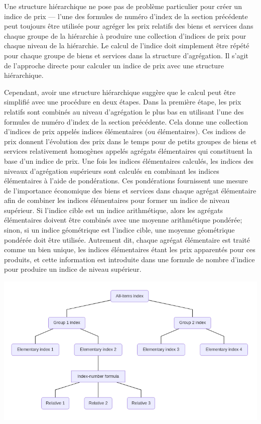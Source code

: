 \documentclass[]{article}
\begin{document}
Une structure hiérarchique ne pose pas de problème particulier pour créer un indice de prix --- l'une des formules de numéro d'index de la section précédente peut toujours être utilisée pour agréger les prix relatifs des biens et services dans chaque groupe de la hiérarchie à produire une collection d'indices de prix pour chaque niveau de la hiérarchie. Le calcul de l'indice doit simplement être répété pour chaque groupe de biens et services dans la structure d'agrégation. Il s'agit de l'approche directe pour calculer un indice de prix avec une structure hiérarchique.

Cependant, avoir une structure hiérarchique suggère que le calcul peut être simplifié avec une procédure en deux étapes. Dans la première étape, les prix relatifs sont combinés au niveau d'agrégation le plus bas en utilisant l'une des formules de numéro d'index de la section précédente. Cela donne une collection d'indices de prix appelés indices élémentaires (ou élémentaires). Ces indices de prix donnent l'évolution des prix dans le temps pour de petits groupes de biens et services relativement homogènes appelés agrégats élémentaires qui constituent la base d'un indice de prix. Une fois les indices élémentaires calculés, les indices des niveaux d'agrégation supérieurs sont calculés en combinant les indices élémentaires à l'aide de pondérations. Ces pondérations fournissent une mesure de l'importance économique des biens et services dans chaque agrégat élémentaire afin de combiner les indices élémentaires pour former un indice de niveau supérieur. Si l'indice cible est un indice arithmétique, alors les agrégats élémentaires doivent être combinés avec une moyenne arithmétique pondérée; sinon, si un indice géométrique est l'indice cible, une moyenne géométrique pondérée doit être utilisée. Autrement dit, chaque agrégat élémentaire est traité comme un bien unique, les indices élémentaires étant les prix apparentés pour ces produits, et cette information est introduite dans une formule de nombre d'indice pour produire un indice de niveau supérieur.

\includegraphics{img/plot2.png}
\end{document}
